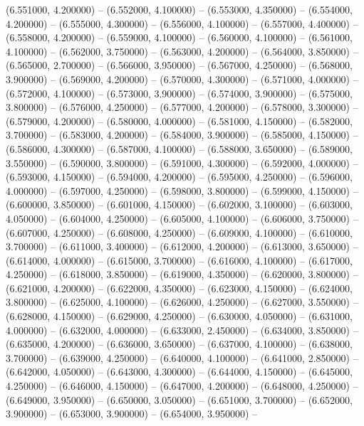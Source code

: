 (6.551000, 4.200000) -- 
(6.552000, 4.100000) -- 
(6.553000, 4.350000) -- 
(6.554000, 4.200000) -- 
(6.555000, 4.300000) -- 
(6.556000, 4.100000) -- 
(6.557000, 4.400000) -- 
(6.558000, 4.200000) -- 
(6.559000, 4.100000) -- 
(6.560000, 4.100000) -- 
(6.561000, 4.100000) -- 
(6.562000, 3.750000) -- 
(6.563000, 4.200000) -- 
(6.564000, 3.850000) -- 
(6.565000, 2.700000) -- 
(6.566000, 3.950000) -- 
(6.567000, 4.250000) -- 
(6.568000, 3.900000) -- 
(6.569000, 4.200000) -- 
(6.570000, 4.300000) -- 
(6.571000, 4.000000) -- 
(6.572000, 4.100000) -- 
(6.573000, 3.900000) -- 
(6.574000, 3.900000) -- 
(6.575000, 3.800000) -- 
(6.576000, 4.250000) -- 
(6.577000, 4.200000) -- 
(6.578000, 3.300000) -- 
(6.579000, 4.200000) -- 
(6.580000, 4.000000) -- 
(6.581000, 4.150000) -- 
(6.582000, 3.700000) -- 
(6.583000, 4.200000) -- 
(6.584000, 3.900000) -- 
(6.585000, 4.150000) -- 
(6.586000, 4.300000) -- 
(6.587000, 4.100000) -- 
(6.588000, 3.650000) -- 
(6.589000, 3.550000) -- 
(6.590000, 3.800000) -- 
(6.591000, 4.300000) -- 
(6.592000, 4.000000) -- 
(6.593000, 4.150000) -- 
(6.594000, 4.200000) -- 
(6.595000, 4.250000) -- 
(6.596000, 4.000000) -- 
(6.597000, 4.250000) -- 
(6.598000, 3.800000) -- 
(6.599000, 4.150000) -- 
(6.600000, 3.850000) -- 
(6.601000, 4.150000) -- 
(6.602000, 3.100000) -- 
(6.603000, 4.050000) -- 
(6.604000, 4.250000) -- 
(6.605000, 4.100000) -- 
(6.606000, 3.750000) -- 
(6.607000, 4.250000) -- 
(6.608000, 4.250000) -- 
(6.609000, 4.100000) -- 
(6.610000, 3.700000) -- 
(6.611000, 3.400000) -- 
(6.612000, 4.200000) -- 
(6.613000, 3.650000) -- 
(6.614000, 4.000000) -- 
(6.615000, 3.700000) -- 
(6.616000, 4.100000) -- 
(6.617000, 4.250000) -- 
(6.618000, 3.850000) -- 
(6.619000, 4.350000) -- 
(6.620000, 3.800000) -- 
(6.621000, 4.200000) -- 
(6.622000, 4.350000) -- 
(6.623000, 4.150000) -- 
(6.624000, 3.800000) -- 
(6.625000, 4.100000) -- 
(6.626000, 4.250000) -- 
(6.627000, 3.550000) -- 
(6.628000, 4.150000) -- 
(6.629000, 4.250000) -- 
(6.630000, 4.050000) -- 
(6.631000, 4.000000) -- 
(6.632000, 4.000000) -- 
(6.633000, 2.450000) -- 
(6.634000, 3.850000) -- 
(6.635000, 4.200000) -- 
(6.636000, 3.650000) -- 
(6.637000, 4.100000) -- 
(6.638000, 3.700000) -- 
(6.639000, 4.250000) -- 
(6.640000, 4.100000) -- 
(6.641000, 2.850000) -- 
(6.642000, 4.050000) -- 
(6.643000, 4.300000) -- 
(6.644000, 4.150000) -- 
(6.645000, 4.250000) -- 
(6.646000, 4.150000) -- 
(6.647000, 4.200000) -- 
(6.648000, 4.250000) -- 
(6.649000, 3.950000) -- 
(6.650000, 3.050000) -- 
(6.651000, 3.700000) -- 
(6.652000, 3.900000) -- 
(6.653000, 3.900000) -- 
(6.654000, 3.950000) -- 
